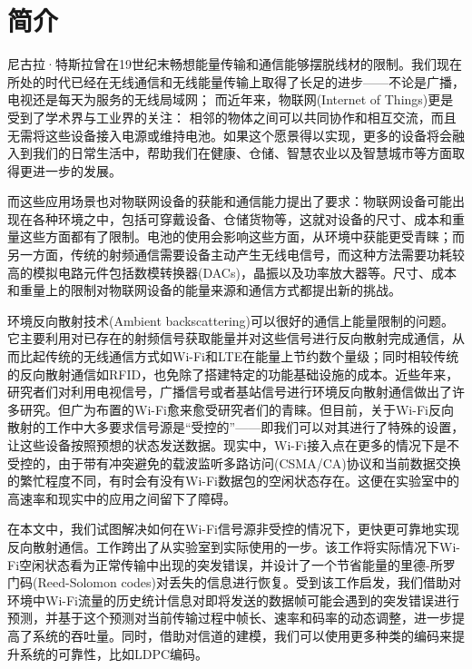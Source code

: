 
\chapter{简介}
\label{chap:introduction}

尼古拉·特斯拉曾在19世纪末畅想能量传输和通信能够摆脱线材的限制。我们现在所处的时代已经在无线通信和无线能量传输上取得了长足的进步——不论是广播，电视还是每天为服务的无线局域网；
而近年来，物联网(Internet of Things)更是受到了学术界与工业界的关注：
相邻的物体之间可以共同协作和相互交流，而且无需将这些设备接入电源或维持电池\cite{}。如果这个愿景得以实现，更多的设备将会融入到我们的日常生活中，帮助我们在健康、仓储、智慧农业以及智慧城市等方面取得更进一步的发展\cite{}。

而这些应用场景也对物联网设备的获能和通信能力提出了要求：物联网设备可能出现在各种环境之中，包括可穿戴设备\cite{}、仓储货物\cite{}等，这就对设备的尺寸、成本和重量这些方面都有了限制。电池的使用会影响这些方面，从环境中获能更受青睐；而另一方面，传统的射频通信需要设备主动产生无线电信号，而这种方法需要功耗较高的模拟电路元件包括数模转换器(DACs)，晶振以及功率放大器等\cite{}。尺寸、成本和重量上的限制对物联网设备的能量来源和通信方式都提出新的挑战。

环境反向散射技术(Ambient backscattering)可以很好的通信上能量限制的问题。它主要利用对已存在的射频信号获取能量并对这些信号进行反向散射完成通信，从而比起传统的无线通信方式如Wi-Fi和LTE在能量上节约数个量级；同时相较传统的反向散射通信如RFID，也免除了搭建特定的功能基础设施的成本\cite{}。近些年来，研究者们对利用电视信号\cite{}，广播信号\cite{}或者基站信号\cite{}进行环境反向散射通信做出了许多研究。但广为布置的Wi-Fi愈来愈受研究者们的青睐。但目前，关于Wi-Fi反向散射的工作中大多要求信号源是“受控的”——即我们可以对其进行了特殊的设置，让这些设备按照预想的状态发送数据。现实中，Wi-Fi接入点在更多的情况下是不受控的，由于带有冲突避免的载波监听多路访问(CSMA/CA)协议和当前数据交换的繁忙程度不同，有时会有没有Wi-Fi数据包的空闲状态存在。这便在实验室中的高速率和现实中的应用之间留下了障碍。


在本文中，我们试图解决如何在Wi-Fi信号源非受控的情况下，更快更可靠地实现反向散射通信。工作\cite{}跨出了从实验室到实际使用的一步。该工作将实际情况下Wi-Fi空闲状态看为正常传输中出现的突发错误，并设计了一个节省能量的里德-所罗门码(Reed-Solomon codes)对丢失的信息进行恢复。受到该工作启发，我们借助对环境中Wi-Fi流量的历史统计信息对即将发送的数据帧可能会遇到的突发错误进行预测，并基于这个预测对当前传输过程中帧长、速率和码率的动态调整，进一步提高了系统的吞吐量。同时，借助对信道的建模，我们可以使用更多种类的编码来提升系统的可靠性，比如LDPC编码。

